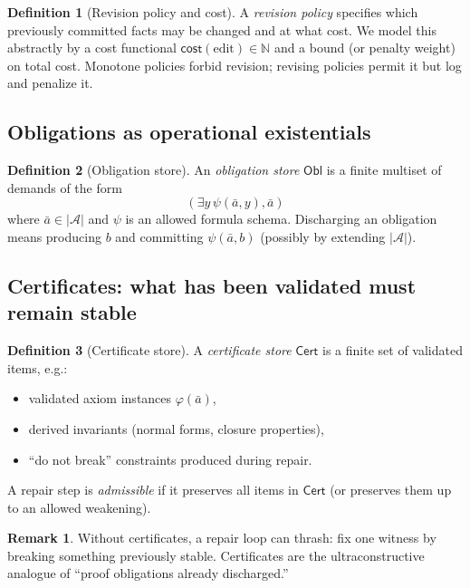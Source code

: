 \documentclass[11pt]{article}
\theoremstyle{definition}
\newtheorem{definition}{Definition}[section]
\newtheorem{remark}{Remark}[section]
\theoremstyle{plain}
\newcommand{\Struct}{\mathcal{A}}
\newcommand{\Univ}{\left|\Struct\right|}
\newcommand{\N}{\mathbb{N}}
\newcommand{\cost}{\mathsf{cost}}
\newcommand{\Cert}{\mathsf{Cert}}
\newcommand{\Obl}{\mathsf{Obl}}
\begin{document}
\begin{definition}[Revision policy and cost]
A \emph{revision policy} specifies which previously committed facts may be changed and at what cost.
We model this abstractly by a cost functional $\cost(\text{edit})\in\N$ and a bound (or penalty weight) on total cost.
Monotone policies forbid revision; revising policies permit it but log and penalize it.
\end{definition}

\subsection{Obligations as operational existentials}

\begin{definition}[Obligation store]
An \emph{obligation store} $\Obl$ is a finite multiset of demands of the form
\[
(\exists y\,\psi(\bar a,y),\bar a)
\]
where $\bar a\in\Univ$ and $\psi$ is an allowed formula schema. Discharging an obligation means producing $b$
and committing $\psi(\bar a,b)$ (possibly by extending $\Univ$).
\end{definition}

\subsection{Certificates: what has been validated must remain stable}

\begin{definition}[Certificate store]
A \emph{certificate store} $\Cert$ is a finite set of validated items, e.g.:
\begin{itemize}[leftmargin=1.5em]
\item validated axiom instances $\varphi(\bar a)$,
\item derived invariants (normal forms, closure properties),
\item ``do not break'' constraints produced during repair.
\end{itemize}
A repair step is \emph{admissible} if it preserves all items in $\Cert$ (or preserves them up to an allowed weakening).
\end{definition}

\begin{remark}
Without certificates, a repair loop can thrash: fix one witness by breaking something previously stable.
Certificates are the ultraconstructive analogue of ``proof obligations already discharged.''
\end{remark}
\end{document}
